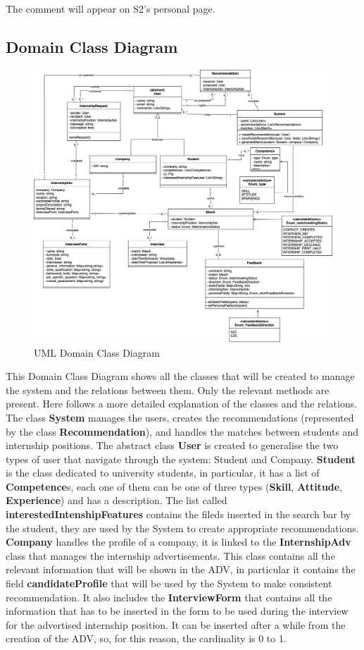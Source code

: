 The comment will appear on S2's personal page.

\subsection{Domain Class Diagram}
\begin{figure}[H]
    \centering
    \includegraphics[width=15cm]{Images/RASD-Final Domain Class Diagram.png}
    \caption{UML Domain Class Diagram}
\end{figure}
This Domain Class Diagram shows all the classes that will be created to manage the system and the relations between them. Only the relevant methods are present.
Here follows a more detailed explanation of the classes and the relations.\newline
The class \textbf{System} manages the users, creates the recommendations (represented by the class \textbf{Recommendation}), and handles the matches between students and internship positions. The abstract class \textbf{User} is created to generalise the two types of user that navigate through the system: Student and Company. \textbf{Student} is the class dedicated to university students, in particular, it has a list of \textbf{Competence}s, each one of them can be one of three types (\textbf{Skill}, \textbf{Attitude}, \textbf{Experience}) and has a description. The list called \textbf{interestedIntenshipFeatures} contains the fileds inserted in the search bar by the student, they are used by the System to create appropriate recommendations. \textbf{Company} handles the profile of a company, it is linked to the \textbf{InternshipAdv} class that manages the internship advertisements. This class contains all the relevant information that will be shown in the ADV, in particular it contains the field \textbf{candidateProfile} that will be used by the System to make consistent recommendation. It also includes the \textbf{InterviewForm} that contains all the information that has to be inserted in the form to be used during the interview for the advertised internship position. It can be inserted after a while from the creation of the ADV, so, for this reason, the cardinality is 0 to 1.\newline
